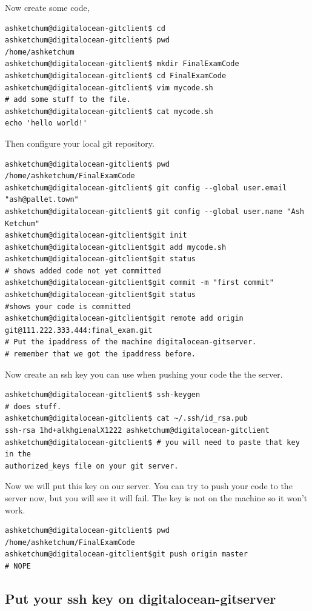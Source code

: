 \documentclass[10pt]{article}
\begin{document}
Now create some code,
\begin{lstlisting}
ashketchum@digitalocean-gitclient$ cd
ashketchum@digitalocean-gitclient$ pwd
/home/ashketchum
ashketchum@digitalocean-gitclient$ mkdir FinalExamCode
ashketchum@digitalocean-gitclient$ cd FinalExamCode
ashketchum@digitalocean-gitclient$ vim mycode.sh
# add some stuff to the file.
ashketchum@digitalocean-gitclient$ cat mycode.sh
echo 'hello world!'
\end{lstlisting}

Then configure your local git repository.
\begin{lstlisting}
ashketchum@digitalocean-gitclient$ pwd
/home/ashketchum/FinalExamCode
ashketchum@digitalocean-gitclient$ git config --global user.email
"ash@pallet.town"
ashketchum@digitalocean-gitclient$ git config --global user.name "Ash Ketchum"
ashketchum@digitalocean-gitclient$git init
ashketchum@digitalocean-gitclient$git add mycode.sh
ashketchum@digitalocean-gitclient$git status
# shows added code not yet committed
ashketchum@digitalocean-gitclient$git commit -m "first commit"
ashketchum@digitalocean-gitclient$git status
#shows your code is committed
ashketchum@digitalocean-gitclient$git remote add origin
git@111.222.333.444:final_exam.git
# Put the ipaddress of the machine digitalocean-gitserver.
# remember that we got the ipaddress before.
\end{lstlisting}

Now create an ssh key you can use when pushing your code the the server.
\begin{lstlisting}
ashketchum@digitalocean-gitclient$ ssh-keygen
# does stuff.
ashketchum@digitalocean-gitclient$ cat ~/.ssh/id_rsa.pub
ssh-rsa 1hd+alkhgienalX1222 ashketchum@digitalocean-gitclient
ashketchum@digitalocean-gitclient$ # you will need to paste that key in the
authorized_keys file on your git server.
\end{lstlisting}

Now we will put this key on our server. You can try to push your code to the
server now, but you will see it will fail. The key is not on the machine so it
won't work.

\begin{lstlisting}
ashketchum@digitalocean-gitclient$ pwd
/home/ashketchum/FinalExamCode
ashketchum@digitalocean-gitclient$git push origin master
# NOPE
\end{lstlisting}

\subsection{Put your ssh key on digitalocean-gitserver}
\end{document}
